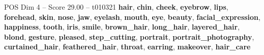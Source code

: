 \begin{textsample}{POS Dim 4 – Score 29.00 – t010321}  \label{ex:f4_pos_005}
\textbf{hair}, \textbf{chin}, \textbf{cheek}, \textbf{eyebrow}, \textbf{lips}, \textbf{forehead}, \textbf{skin}, \textbf{nose}, \textbf{jaw}, \textbf{eyelash}, \textbf{mouth}, \textbf{eye}, \textbf{beauty}, \textbf{facial\_expression}, \textbf{happiness}, \textbf{tooth}, \textbf{iris}, \textbf{smile}, \textbf{brown\_hair}, \textbf{long\_hair}, \textbf{layered\_hair}, \textbf{blond}, \textbf{gesture}, \textbf{pleased}, \textbf{step\_cutting}, \textbf{portrait}, \textbf{portrait\_photography}, \textbf{curtained\_hair}, \textbf{feathered\_hair}, \textbf{throat}, \textbf{earring}, \textbf{makeover}, \textbf{hair\_care}

\end{textsample}
